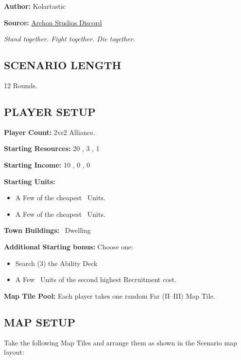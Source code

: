 
\begin{multicols*}{2}

\textbf{Author:} Kolartastic

\textbf{Source:} \href{https://discord.com/channels/740870068178649108/1161571991732625468/threads/1164804609605390386}{Archon Studios Discord}

\textit{Stand together. Fight together. Die together.}  %

\subsection*{\MakeUppercase{Scenario Length}}
12 Rounds.

\subsection*{\MakeUppercase{Player Setup}}
\textbf{Player Count:} 2vs2 Alliance.

\textbf{Starting Resources:} 20 , 3 , 1 

\textbf{Starting Income:} 10 , 0 , 0 

\textbf{Starting Units:}

\begin{itemize}
  \item A Few of the cheapest \bronze\ Units.
  \item A Few of the cheapest \silver\ Units.
\end{itemize}

\textbf{Town Buildings:} \bronze\ Dwelling

\textbf{Additional Starting bonus:}
Choose one:
\begin{itemize}
  \item Search (3) the Ability Deck
  \item A Few \bronze\ Units of the second highest Recruitment cost.
\end{itemize}

\textbf{Map Tile Pool:} Each player takes one random Far (II–III) Map Tile.

\subsection*{\MakeUppercase{Map Setup}}
Take the following Map Tiles and arrange them as shown in the Scenario map layout:


\end{multicols*}
